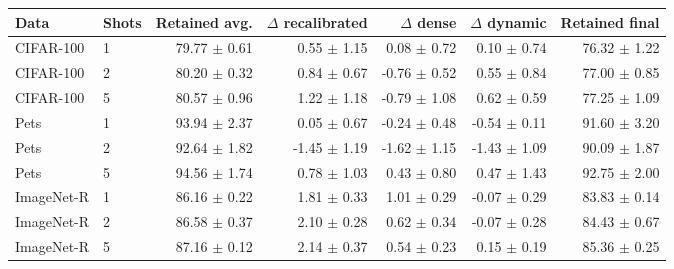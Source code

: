 \begin{tabular}{llrrrrr}
\toprule
Data & Shots & Retained avg. & $\Delta$ recalibrated & $\Delta$ dense & $\Delta$ dynamic & Retained final \\
\midrule
CIFAR-100 & 1 & 79.77 $\pm$ 0.61 & 0.55 $\pm$ 1.15 & 0.08 $\pm$ 0.72 & 0.10 $\pm$ 0.74 & 76.32 $\pm$ 1.22 \\
CIFAR-100 & 2 & 80.20 $\pm$ 0.32 & 0.84 $\pm$ 0.67 & -0.76 $\pm$ 0.52 & 0.55 $\pm$ 0.84 & 77.00 $\pm$ 0.85 \\
CIFAR-100 & 5 & 80.57 $\pm$ 0.96 & 1.22 $\pm$ 1.18 & -0.79 $\pm$ 1.08 & 0.62 $\pm$ 0.59 & 77.25 $\pm$ 1.09 \\
\midrule
Pets & 1 & 93.94 $\pm$ 2.37 & 0.05 $\pm$ 0.67 & -0.24 $\pm$ 0.48 & -0.54 $\pm$ 0.11 & 91.60 $\pm$ 3.20 \\
Pets & 2 & 92.64 $\pm$ 1.82 & -1.45 $\pm$ 1.19 & -1.62 $\pm$ 1.15 & -1.43 $\pm$ 1.09 & 90.09 $\pm$ 1.87 \\
Pets & 5 & 94.56 $\pm$ 1.74 & 0.78 $\pm$ 1.03 & 0.43 $\pm$ 0.80 & 0.47 $\pm$ 1.43 & 92.75 $\pm$ 2.00 \\
\midrule
ImageNet-R & 1 & 86.16 $\pm$ 0.22 & 1.81 $\pm$ 0.33 & 1.01 $\pm$ 0.29 & -0.07 $\pm$ 0.29 & 83.83 $\pm$ 0.14 \\
ImageNet-R & 2 & 86.58 $\pm$ 0.37 & 2.10 $\pm$ 0.28 & 0.62 $\pm$ 0.34 & -0.07 $\pm$ 0.28 & 84.43 $\pm$ 0.67 \\
ImageNet-R & 5 & 87.16 $\pm$ 0.12 & 2.14 $\pm$ 0.37 & 0.54 $\pm$ 0.23 & 0.15 $\pm$ 0.19 & 85.36 $\pm$ 0.25 \\
\bottomrule
\end{tabular}
